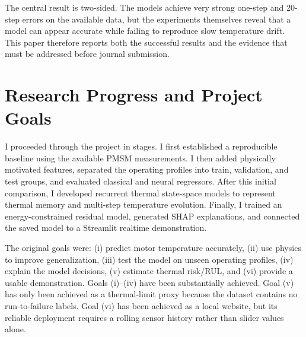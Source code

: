 \documentclass[conference]{IEEEtran}
\begin{document}
The central result is two-sided. The models achieve very strong one-step and
20-step errors on the available data, but the experiments themselves reveal
that a model can appear accurate while failing to reproduce slow temperature
drift. This paper therefore reports both the successful results and the
evidence that must be addressed before journal submission.

\section{Research Progress and Project Goals}
I proceeded through the project in stages. I first established a reproducible
baseline using the available PMSM measurements. I then added physically
motivated features, separated the operating profiles into train, validation,
and test groups, and evaluated classical and neural regressors. After this
initial comparison, I developed recurrent thermal state-space models to
represent thermal memory and multi-step temperature evolution. Finally, I
trained an energy-constrained residual model, generated SHAP explanations, and
connected the saved model to a Streamlit realtime demonstration.

The original goals were: (i) predict motor temperature accurately, (ii) use
physics to improve generalization, (iii) test the model on unseen operating
profiles, (iv) explain the model decisions, (v) estimate thermal risk/RUL, and
(vi) provide a usable demonstration. Goals (i)--(iv) have been substantially
achieved. Goal (v) has only been achieved as a thermal-limit proxy because the
dataset contains no run-to-failure labels. Goal (vi) has been achieved as a
local website, but its reliable deployment requires a rolling sensor history
rather than slider values alone.
\end{document}
